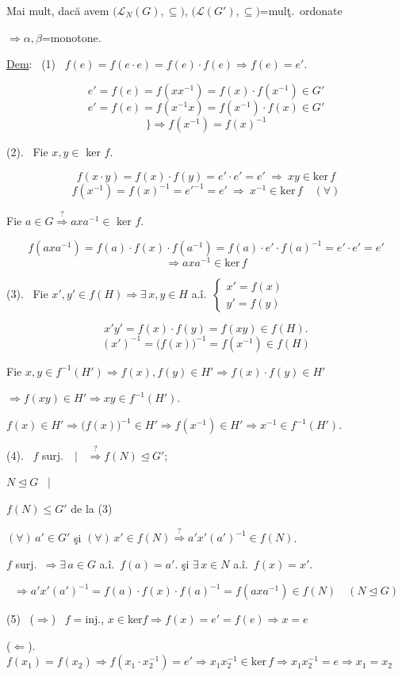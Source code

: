 \documentclass[12pt]{article}
\begin{document}
\noindent Mai mult, dacă avem $\big(\mathcal{L}_N(G),\subseteq\big)$, $\big(\mathcal{L}(G'),\subseteq\big)$=mulţ.\ ordonate

\noindent $\Rightarrow \alpha,\beta$=monotone.

\bigskip
\noindent\underline{Dem}: \ (1) \ $f(e) = f(e\cdot e) = f(e)\cdot f(e) \Rightarrow f(e)=e'$.

\[
e' = f(e) = f(xx^{-1}) = f(x)\cdot f(x^{-1}) \in G'
\]
\[
e' = f(e) = f(x^{-1}x) = f(x^{-1})\cdot f(x) \in G'
\]
\[
\Big\} \Rightarrow f(x^{-1}) = f(x)^{-1}
\]

\bigskip
\noindent (2). \ Fie $x,y\in$ ker $f$.

\[
f(x\cdot y) = f(x)\cdot f(y) = e'\cdot e' = e' \ \Rightarrow \ xy\in\text{ker}\,f
\]
\[
f(x^{-1}) = f(x)^{-1} = e'^{-1} = e' \ \Rightarrow \ x^{-1}\in\text{ker}\,f \quad (\forall)
\]

\bigskip
\noindent Fie $a\in G \overset{?}{\Rightarrow} axa^{-1}\in$ ker $f$.

\[
f(axa^{-1}) = f(a)\cdot f(x)\cdot f(a^{-1}) = f(a)\cdot e'\cdot f(a)^{-1} = e'\cdot e' = e'
\]
\[
\Rightarrow axa^{-1}\in\text{ker}\,f
\]

\bigskip
\noindent (3). \ Fie $x',y'\in f(H) \Rightarrow \exists\,x,y\in H$ a.î.\ $\begin{cases}x'=f(x)\\y'=f(y)\end{cases}$

\[
x'y' = f(x)\cdot f(y) = f(xy) \in f(H).
\]
\[
(x')^{-1} = \big(f(x)\big)^{-1} = f(x^{-1}) \in f(H)
\]

\bigskip
\noindent Fie $x,y\in f^{-1}(H') \Rightarrow f(x),f(y)\in H' \Rightarrow f(x)\cdot f(y)\in H'$

\noindent $\Rightarrow f(xy)\in H' \Rightarrow xy\in f^{-1}(H')$.

\noindent $f(x)\in H' \Rightarrow \big(f(x)\big)^{-1}\in H' \Rightarrow f(x^{-1})\in H' \Rightarrow x^{-1}\in f^{-1}(H')$.

\bigskip
\noindent (4). \ $f$ surj.\ \ $\Big|$ \ $\overset{?}{\Rightarrow} f(N)\trianglelefteq G'$;

\noindent $N\trianglelefteq G$ \ $\Big|$

\noindent $f(N)\leq G'$ de la (3)

\bigskip
\noindent $(\forall)\,a'\in G'$ şi $(\forall)\,x'\in f(N) \overset{?}{\Rightarrow} a'x'(a')^{-1}\in f(N)$.

\noindent $f$ surj.\ $\Rightarrow \exists\,a\in G$ a.î.\ $f(a)=a'$. \quad şi $\exists\,x\in N$ a.î.\ $f(x)=x'$.

\[
\Rightarrow a'x'(a')^{-1} = f(a)\cdot f(x)\cdot f(a)^{-1} = f(axa^{-1}) \in f(N) \quad (N\trianglelefteq G)
\]

\bigskip
\noindent (5) \ ($\Rightarrow$) \ $f=$inj., $x\in$ker$f \Rightarrow f(x)=e'=f(e) \Rightarrow x=e$

\noindent ($\Leftarrow$). \ $f(x_1)=f(x_2) \Rightarrow f(x_1\cdot x_2^{-1})=e' \Rightarrow x_1x_2^{-1}\in\text{ker}\,f \Rightarrow x_1x_2^{-1}=e \Rightarrow x_1=x_2$
\end{document}

